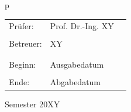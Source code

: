 \begin{center}
\begin{tabular}{p{\textwidth}}
\vspace{1cm}

\begin{center}
\begin{tabular}{lll}
\large{Prüfer:} & \large Prof. Dr.-Ing. XY\\
\\
\large{Betreuer:} & \large XY\\
\\
\\
\large{Beginn:}  & \large Ausgabedatum\\
\\
\large{Ende:}  & \large Abgabedatum\\

\end{tabular}
\end{center}

\vspace{3cm}

\begin{center}
\large Semester 20XY\\
\end{center}

\end{tabular}
\end{center}